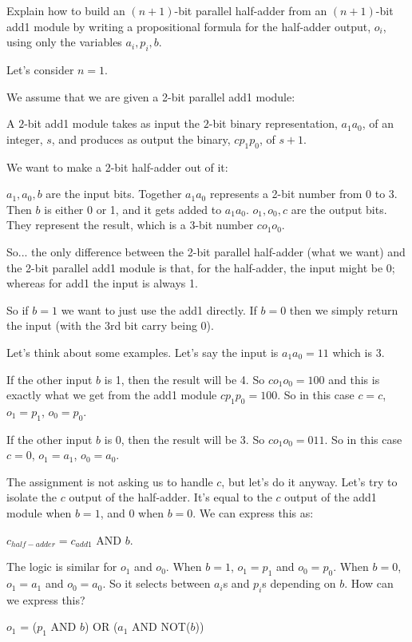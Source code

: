 \documentclass[14pt]{extarticle}
\begin{document}
Explain how to build an $(n+1)$-bit parallel half-adder from an $(n+1)$-bit add1 module by writing a propositional formula for the half-adder output, $o_i$, using only the variables $a_i, p_i, b$.

Let's consider $n = 1$.

We assume that we are given a 2-bit parallel add1 module:

A $2$-bit add1 module takes as in­put the $2$-bit binary representation, $a_1a_0$, of an integer, $s$, and produces as output the binary, $c p_1p_0$, of $s + 1$.

We want to make a 2-bit half-adder out of it:

$a_1, a_0, b$ are the input bits. Together $a_1a_0$ represents a 2-bit number from 0 to 3. Then $b$ is either 0 or 1, and it gets added to $a_1a_0$. $o_1, o_0, c$ are the output bits. They represent the result, which is a 3-bit number $co_1o_0$.

So... the only difference between the 2-bit parallel half-adder (what we want) and the 2-bit parallel add1 module is that, for the half-adder, the input might be 0; whereas for add1 the input is always 1.

So if $b = 1$ we want to just use the add1 directly. If $b = 0$ then we simply return the input (with the 3rd bit carry being 0).

Let's think about some examples. Let's say the input is $a_1a_0 = 11$ which is 3. 

If the other input $b$ is 1, then the result will be 4. So $co_1o_0 = 100$ and this is exactly what we get from the add1 module $cp_1p_0 = 100$. So in this case $c = c$, $o_1 = p_1$, $o_0 = p_0$.

If the other input $b$ is 0, then the result will be 3. So $co_1o_0 = 011$. So in this case $c = 0$, $o_1 = a_1$, $o_0 = a_0$.

The assignment is not asking us to handle $c$, but let's do it anyway. Let's try to isolate the $c$ output of the half-adder. It's equal to the $c$ output of the add1 module when $b = 1$, and $0$ when $b = 0$. We can express this as: 

$c_{half-adder} = c_{add1}$ AND $b$.

The logic is similar for $o_1$ and $o_0$. When $b = 1$, $o_1 = p_1$ and $o_0 = p_0$. When $b = 0$, $o_1 = a_1$ and $o_0 = a_0$. So it selects between $a_i$s and $p_i$s depending on $b$. How can we express this?

$o_1$ = ($p_1$ AND $b$) OR ($a_1$ AND NOT($b$))
\end{document}
